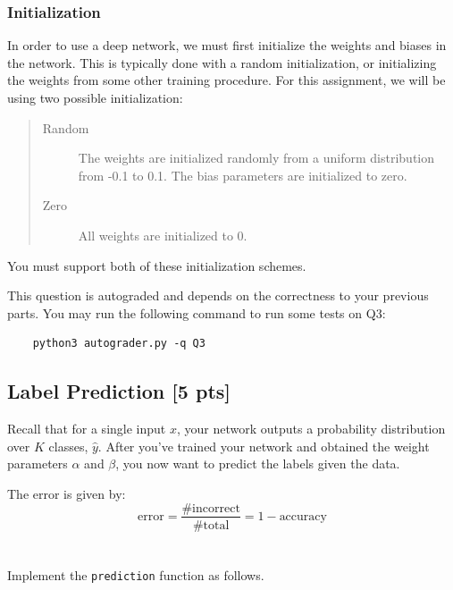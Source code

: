 \subsubsection{Initialization}
\label{sec:init}
In order to use a deep network, we must first initialize the weights and biases in the network. This is typically done with a random initialization, or initializing the weights from some other training procedure. For this assignment, we will be using two possible initialization: 
\begin{quote}
\begin{description}
\item[{\sc Random}] The weights are initialized randomly from a uniform distribution from -0.1 to 0.1. The bias parameters are initialized to zero.
\item[{\sc Zero}] All weights are initialized to 0.  
\end{description}
\end{quote}

You must support both of these initialization schemes.
\vspace{0.15in}

This question is autograded and depends on the correctness to your previous parts. You may run the following command to run some tests on Q3:
\begin{verbatim}
    python3 autograder.py -q Q3
\end{verbatim}
\vspace{0.3in}
\subsection{Label Prediction [5 pts]}
Recall that for a single input $x$, your network outputs a probability distribution over $K$ classes,  $\hat{y}$. After you've trained your network and obtained the weight parameters \textbf{$\alpha$} and \textbf{$\beta$}, you now want to predict the labels given the data.

The error is given by:
\[\mathrm{error} = \frac{\textrm{\# incorrect}}{\textrm{\# total}} = 1 - \textrm{accuracy}\]
\\\\Implement the \texttt{prediction} function as follows.

